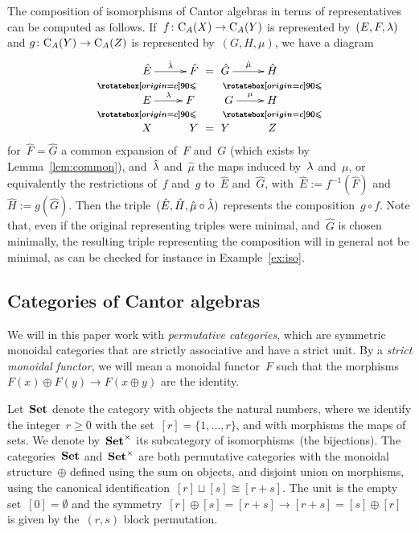 \begin{rem}\label{rem:comptriples}
The composition of isomorphisms of Cantor algebras in terms of representatives can be computed as follows. If~$f\colon\mathrm{C}_A(X)\to \mathrm{C}_A(Y)$ is represented by~$(E,F,\lambda)$ and  
$g\colon\mathrm{C}_A(Y)\to \mathrm{C}_A(Z)$ is represented by~$(G,H,\mu)$, we have a diagram 
$$\xymatrix@R-1pc{\hat E \ar@{}[d]|\IV \ar[r]^-{\hat \la} & \hat F\ =\ \hat G \ar@{}[d]|{\IV\ \ \ \ \ \ \ \IV} \ar[r]^-{\hat \mu} & \hat H \ar@{}[d]|\IV \\
E \ar@{}[d]|\IV \ar[r]^-{\la} & F\ \ \ \ \ \  \  \  G \ar@{}[d]|{\IV\ \ \ \ \ \ \ \IV} \ar[r]^-{\mu} & H \ar@{}[d]|\IV \\
X & Y \ =\ Y  & Z
}$$
for~$\hat F=\hat G$ a common expansion of~$F$ and~$G$ (which exists by Lemma~\ref{lem:common}), and~$\hat {\lambda}$ and~$\hat \mu$ the maps induced by~$\lambda$ and~$\mu$, or equivalently the restrictions of~$f$ and~$g$ to~$\hat E$ and~$\hat G$, with~$\hat E:=f^{-1}(\hat F)$ and~$\hat H:=g(\hat G)$. Then the triple~$(\hat E,\hat H,\hat \mu\circ \hat {\lambda})$ represents the composition~$g\circ f$.  Note that, even if the original representing triples were minimal, and~$\hat G$ is chosen minimally, the resulting triple representing the composition will in general not be minimal, as can be checked for instance in Example~\ref{ex:iso}. 
\end{rem}

\subsection{Categories of Cantor algebras}\label{sec:catcan}

We will in this paper work with {\em  permutative categories}, which are symmetric monoidal categories that are strictly associative and have a strict unit. By a {\em strict monoidal functor}, we will mean a monoidal functor~$F$ such that the morphisms~$F(x)\oplus F(y)\to F(x\oplus y)$ are the identity. 

Let~$\mathbf{Set}$ denote the category with objects the natural numbers, where we identify the integer~$r\ge 0$ with the set~\hbox{$[r]=\{1,\dots,r\}$}, and with morphisms the maps of sets. We denote by~$\mathbf{Set}^\times$ its subcategory of isomorphisms~(the bijections). The categories~$\mathbf{Set}$ and~$\mathbf{Set}^\times$ are both permutative categories with the monoidal structure~$\oplus$ defined using the sum on objects, and disjoint union on morphisms, using the canonical identification~$[r]\sqcup [s]\cong [r+s]$. The unit is the empty set~$[0]=\emptyset$ and the symmetry~$[r]\oplus [s]=[r+s]\to [r+s]=[s]\oplus [r]$ is given by the~$(r,s)$ block permutation. 

